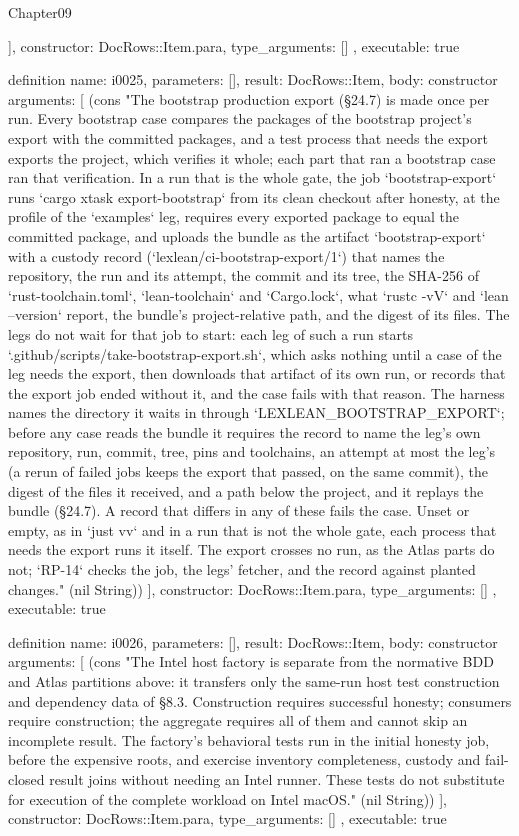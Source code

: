 \begin{lexlean}{Chapter09}
\begin{semanticmodule}
{{    ],
    constructor: DocRows::Item.para,
    type_arguments: []
  },
  executable: true
}

definition{
  name: i0025,
  parameters: [],
  result: DocRows::Item,
  body: constructor{
    arguments: [
      (cons "The bootstrap production export (§24.7) is made once per run. Every bootstrap case compares the packages of the bootstrap project's export with the committed packages, and a test process that needs the export exports the project, which verifies it whole; each part that ran a bootstrap case ran that verification. In a run that is the whole gate, the job `bootstrap-export` runs `cargo xtask export-bootstrap` from its clean checkout after honesty, at the profile of the `examples` leg, requires every exported package to equal the committed package, and uploads the bundle as the artifact `bootstrap-export` with a custody record (`lexlean/ci-bootstrap-export/1`) that names the repository, the run and its attempt, the commit and its tree, the SHA-256 of `rust-toolchain.toml`, `lean-toolchain` and `Cargo.lock`, what `rustc -vV` and `lean --version` report, the bundle's project-relative path, and the digest of its files. The legs do not wait for that job to start: each leg of such a run starts `.github/scripts/take-bootstrap-export.sh`, which asks nothing until a case of the leg needs the export, then downloads that artifact of its own run, or records that the export job ended without it, and the case fails with that reason. The harness names the directory it waits in through `LEXLEAN_BOOTSTRAP_EXPORT`; before any case reads the bundle it requires the record to name the leg's own repository, run, commit, tree, pins and toolchains, an attempt at most the leg's (a rerun of failed jobs keeps the export that passed, on the same commit), the digest of the files it received, and a path below the project, and it replays the bundle (§24.7). A record that differs in any of these fails the case. Unset or empty, as in `just vv` and in a run that is not the whole gate, each process that needs the export runs it itself. The export crosses no run, as the Atlas parts do not; `RP-14` checks the job, the legs' fetcher, and the record against planted changes." (nil String))
    ],
    constructor: DocRows::Item.para,
    type_arguments: []
  },
  executable: true
}

definition{
  name: i0026,
  parameters: [],
  result: DocRows::Item,
  body: constructor{
    arguments: [
      (cons "The Intel host factory is separate from the normative BDD and Atlas partitions above: it transfers only the same-run host test construction and dependency data of §8.3. Construction requires successful honesty; consumers require construction; the aggregate requires all of them and cannot skip an incomplete result. The factory's behavioral tests run in the initial honesty job, before the expensive roots, and exercise inventory completeness, custody and fail-closed result joins without needing an Intel runner. These tests do not substitute for execution of the complete workload on Intel macOS." (nil String))
    ],
    constructor: DocRows::Item.para,
    type_arguments: []
  },
  executable: true
}


\end{semanticmodule}
\end{lexlean}
